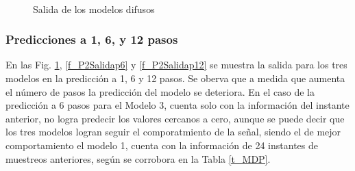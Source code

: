\documentclass[12pt]{article}
\begin{document}
\begin{itemize}
\begin{figure}
		\centering
		\captionsetup{justification=centering}
		\\
		\caption{Salida de los modelos difusos}
		\label{f_P2Salida}
\end{figure}

\end{itemize}

\subsubsection{Predicciones a 1, 6, y 12
pasos}

En las Fig. \ref{f_P2Salida}, \ref{f_P2Salidap6} y \ref{f_P2Salidap12} se muestra la salida para los tres modelos en la predicción a 1, 6 y 12 pasos. Se oberva que a medida que aumenta el número de pasos la predicción del modelo se deteriora. En el caso de la predicción a 6 pasos para el Modelo 3, cuenta solo con la información del instante anterior, no logra predecir los valores cercanos a cero, aunque se puede decir que los tres modelos logran seguir el comporatmiento de la señal, siendo el de mejor comportamiento el modelo 1, cuenta con la información de 24 instantes de muestreos anteriores, según se corrobora en la Tabla \ref{t_MDP}.
\end{document}

